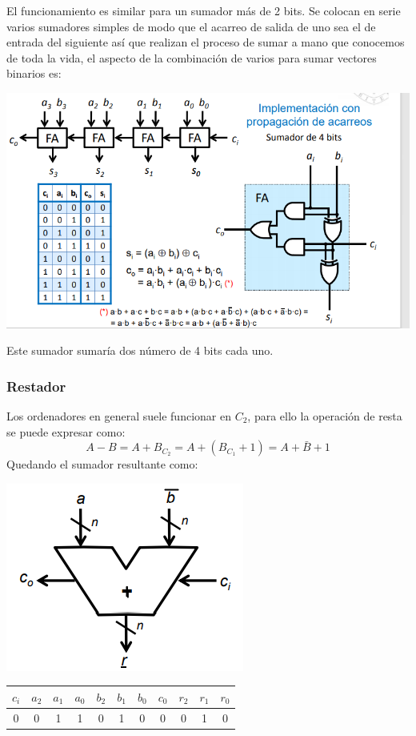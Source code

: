 \documentclass[a4paper,10pt]{book}
\begin{document}
El funcionamiento es similar para un sumador más de 2 bits. Se colocan en serie varios sumadores simples de modo que el acarreo de salida de uno sea el de entrada del siguiente así que realizan el proceso de sumar a mano que conocemos de toda la vida, el aspecto de la combinación de varios para sumar vectores binarios es:

\begin{center}
\includegraphics[scale=0.55]{sumador en serie}
\end{center}

Este sumador sumaría dos número de 4 bits cada uno.

\subsubsection*{Restador}
Los ordenadores en general suele funcionar en $C_2$, para ello la operación de resta se puede expresar como:
$$A-B=A+B_{C_2}=A+(B_{C_1}+1)=A+\bar{B}+1$$
Quedando el sumador resultante como:

\begin{multicols}{2}
\begin{center}
\includegraphics[scale=0.55]{restador sencillo}
\end{center}

\begin{center}
\begin{tabular}{|c|c|c|c|c|c|c|c|c|c|c|}
\hline
$c_i$ & $a_2$ & $a_1$ & $a_0$ & $b_2$ & $b_1$ & $b_0$ & $c_0$ & $r_2$ & $r_1$ & $r_0$ \\
\hline
0 & 0 & 1 & 1 & 0 & 1 & 0 & 0 & 0 & 1 & 0\\
\hline
\end{tabular}
\end{center}
\end{multicols}
\end{document}
